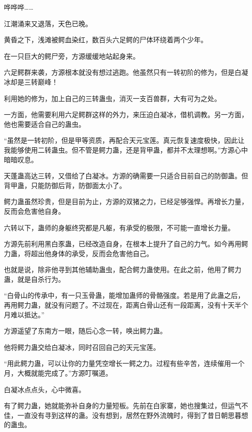 
\begin{this_body}



哗哗哗……

江潮涌来又退落，天色已晚。

黄昏之下，浅滩被鳄血染红，数百头六足鳄的尸体环绕着两个少年。

在一只巨大的鳄尸旁，方源缓缓地站起身来。

六足鳄群来袭，方源根本就没有想过逃跑。他虽然只有一转初阶的修为，但是白凝冰却是三转巅峰！

利用她的修为，加上自己的三转蛊虫，消灭一支百兽群，大有可为之处。

一方面，他需要利用六足鳄群这样的外力，来压迫白凝冰，借机调教。另一方面，他也需要适合自己的蛊虫。

“虽然是一转初阶，但是甲等资质，再配合天元宝莲。真元恢复速度极快，因此让我能够使用二转蛊虫。但不管是鳄力蛊，还是背甲蛊，都并不太理想啊。”方源心中暗暗叹息。

天蓬蛊高达三转，又借给了白凝冰。方源的确需要一只适合目前自己的防御蛊。但背甲蛊，只能防御后背，防御面太小了。

鳄力蛊虽然珍贵，但是目前为止，方源的双猪之力，已经足够强悍。再增长力量，反而会危害他自身。

六转以下，蛊师的身躯终究都是凡躯，有承受的极限，不可能一直增长力量。

方源先前利用黑白豕蛊，已经改造自身，在根本上提升了自己的力气。如今再用鳄力蛊，将超出他身体的承受，反而会危害他自己。

也就是说，除非他寻到其他辅助蛊虫，配合鳄力蛊使用。在此之前，他用了鳄力蛊，就是自杀行为。

“白骨山的传承中，有一只玉骨蛊，能增加蛊师的骨骼强度。若是用了此蛊之后，再用鳄力蛊，就没有问题了。不过现在，距离白骨山还有一段距离，没有十天半个月难以抵达。”

方源遥望了东南方一眼，随后心念一转，唤出鳄力蛊。

他将鳄力蛊交给白凝冰，同时召回自己的天元宝莲。

“用此鳄力蛊，可以让你的力量凭空增长一鳄之力。过程有些辛苦，连续催用一个月，大概就能完成了。”方源叮嘱道。

白凝冰点点头，心中微喜。

有了鳄力蛊，她就能弥补自身的力量短板。先前在白家寨，她也搜集过，但运气不佳，一直没有寻到这样的蛊。没有想到，居然在野外流魄时，得到了昔日朝思暮想的蛊虫。


\end{this_body}
